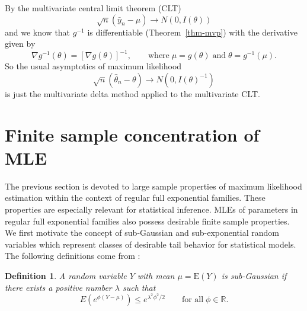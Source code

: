 \documentclass[12pt]{article}
\newcommand{\R}{\mathbb{R}}
\newcommand{\E}{\mathrm{E}}
\DeclareMathOperator{\E}{E}
\newtheorem{defn}{Definition}
\begin{document}
By the multivariate central limit theorem (CLT)
$$
  \sqrt{n}\left(\bar y_n - \mu\right) \to N\left(0, I(\theta)\right)
$$
and we know that $g^{-1}$ is differentiable (Theorem~\ref{thm-mvp}) with the derivative given by 
$$
  \nabla g^{-1}(\theta) = \left[\nabla g(\theta)\right]^{-1}, \qquad \text{where} \; \mu = g(\theta) \; \text{and} \; \theta = g^{-1}(\mu).
$$
So the usual asymptotics of maximum likelihood
\begin{equation} \label{asymptoticsMLE}
	\sqrt{n}\left(\hat\theta_n - \theta\right) \to N\left(0, I(\theta)^{-1}\right)
\end{equation}
is just the multivariate delta method applied to the multivariate CLT.



\section*{Finite sample concentration of MLE}

The previous section is devoted to large sample properties of maximum likelihood estimation within the context of regular full exponential families. These properties are especially relevant for statistical inference. MLEs of parameters in regular full exponential families also possess desirable finite sample properties. We first motivate the concept of sub-Gaussian and sub-exponential random variables which represent classes of desirable tail behavior for statistical models. The following definitions come from \cite{wainwright2019high}:

\begin{defn}
A random variable $Y$ with mean $\mu = \E(Y)$ is \emph{sub-Gaussian} if there exists a positive number $\lambda$ such that 
$$
  E\left(e^{\phi(Y - \mu)}\right) \leq e^{\lambda^2\phi^2/2} 
    \qquad \text{for all} \; \phi \in \R.
$$	
\end{defn}
\end{document}
